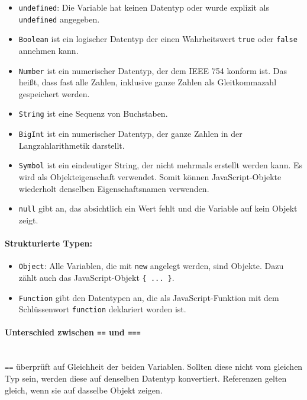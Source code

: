 \begin{itemize}
	\item \texttt{undefined}: Die Variable hat keinen Datentyp oder wurde explizit als \texttt{undefined} angegeben.
	\item \texttt{Boolean} ist ein logischer Datentyp der einen Wahrheitswert  \texttt{true} oder  \texttt{false} annehmen 	
		kann.
	\item \texttt{Number} ist ein numerischer Datentyp, der dem IEEE 754 konform ist. Das heißt, dass fast alle Zahlen, 
		inklusive ganze Zahlen als Gleitkommazahl gespeichert werden.
	\item \texttt{String} ist eine Sequenz von Buchstaben.
	\item \texttt{BigInt} ist ein numerischer Datentyp, der ganze Zahlen in der Langzahlarithmetik darstellt.
	\item \texttt{Symbol} ist ein eindeutiger String, der nicht mehrmals erstellt werden kann. Es wird als Objekteigenschaft 
		verwendet. Somit können JavaScript-Objekte wiederholt denselben Eigenschaftsnamen verwenden.
	\item \texttt{null} gibt an, das absichtlich ein Wert fehlt und die Variable auf kein Objekt zeigt.
\end{itemize}

\paragraph{Strukturierte Typen:}

\begin{itemize}
	\item \texttt{Object}: Alle Variablen, die mit  \texttt{new} angelegt werden, sind Objekte. Dazu zählt auch das 
		JavaScript-Objekt \texttt{\{ ... \}}.
	\item \texttt{Function} gibt den Datentypen an, die als JavaScript-Funktion mit dem Schlüssenwort \texttt{function}
		deklariert worden ist.
\end{itemize}

\paragraph{Unterschied zwischen \texttt{==} und \texttt{===}}

\mbox{}\\
\texttt{==} überprüft auf Gleichheit der beiden Variablen. Sollten diese nicht vom gleichen Typ sein, werden diese auf denselben Datentyp konvertiert. Referenzen gelten gleich, wenn sie auf dasselbe Objekt zeigen.

